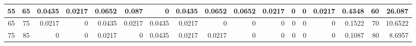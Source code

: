 \begin{table}[ht]
\begin{adjustbox}{width = \textwidth, center}
\begin{tabular}{|cc|r|r|r|r|r|r|r|r|r|r|r|r|r|r|r|}
            \cellcolor[HTML]{C9DAF8}55             & \cellcolor[HTML]{EBF1FC}65             & \cellcolor[HTML]{BCE4D1}0.0435                 & \cellcolor[HTML]{DEF2E8}0.0217                 & \cellcolor[HTML]{9BD7B9}0.0652                 & \cellcolor[HTML]{79C9A2}0.087                  & \cellcolor[HTML]{FFFFFF}0                      & \cellcolor[HTML]{BCE4D1}0.0435                 & \cellcolor[HTML]{9BD7B9}0.0652                 & \cellcolor[HTML]{9BD7B9}0.0652                  & \cellcolor[HTML]{DEF2E8}0.0217                  & \cellcolor[HTML]{FFFFFF}0                       & \cellcolor[HTML]{FFFFFF}0                       & \cellcolor[HTML]{DEF2E8}0.0217                  & \cellcolor[HTML]{D9D2E9}0.4348                                                  & \cellcolor[HTML]{D9D2E9}60                                              & \cellcolor[HTML]{D9D2E9}26.087                                                                   \\ \hline
            \cellcolor[HTML]{C9DAF8}65             & \cellcolor[HTML]{EBF1FC}75             & \cellcolor[HTML]{DEF2E8}0.0217                 & \cellcolor[HTML]{FFFFFF}0                      & \cellcolor[HTML]{BCE4D1}0.0435                 & \cellcolor[HTML]{DEF2E8}0.0217                 & \cellcolor[HTML]{BCE4D1}0.0435                 & \cellcolor[HTML]{DEF2E8}0.0217                 & \cellcolor[HTML]{FFFFFF}0                      & \cellcolor[HTML]{FFFFFF}0                       & \cellcolor[HTML]{FFFFFF}0                       & \cellcolor[HTML]{FFFFFF}0                       & \cellcolor[HTML]{FFFFFF}0                       & \cellcolor[HTML]{FFFFFF}0                       & \cellcolor[HTML]{D9D2E9}0.1522                                                  & \cellcolor[HTML]{D9D2E9}70                                              & \cellcolor[HTML]{D9D2E9}10.6522                                                                  \\ \hline
            \cellcolor[HTML]{C9DAF8}75             & \cellcolor[HTML]{EBF1FC}85             & \cellcolor[HTML]{FFFFFF}0                      & \cellcolor[HTML]{FFFFFF}0                      & \cellcolor[HTML]{DEF2E8}0.0217                 & \cellcolor[HTML]{FFFFFF}0                      & \cellcolor[HTML]{BCE4D1}0.0435                 & \cellcolor[HTML]{DEF2E8}0.0217                 & \cellcolor[HTML]{DEF2E8}0.0217                 & \cellcolor[HTML]{FFFFFF}0                       & \cellcolor[HTML]{FFFFFF}0                       & \cellcolor[HTML]{FFFFFF}0                       & \cellcolor[HTML]{FFFFFF}0                       & \cellcolor[HTML]{FFFFFF}0                       & \cellcolor[HTML]{D9D2E9}0.1087                                                  & \cellcolor[HTML]{D9D2E9}80                                              & \cellcolor[HTML]{D9D2E9}8.6957                                                                   \\ \hline

\end{tabular}
\end{adjustbox}
\end{table}
